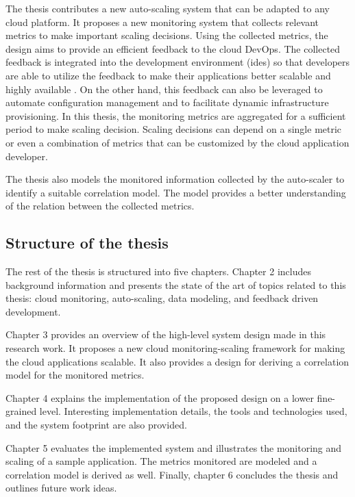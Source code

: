 \documentclass[article,type=msc,colorback,12pt,accentcolor=tud8b,table]{tudthesis}
\begin{document}
	The thesis contributes a new auto-scaling system that can be adapted to any cloud platform. It proposes a new monitoring system that collects relevant metrics to make important scaling decisions. Using the collected metrics, the design aims to provide an efficient feedback to the cloud DevOps. The collected feedback is integrated into the development environment (\gls{ide}s) so that developers are able to utilize the feedback to make their applications better scalable and highly available \cite{cito2015runtime}. On the other hand, this feedback can also be leveraged to automate configuration management and to facilitate dynamic infrastructure provisioning. In this thesis, the monitoring metrics are aggregated for a sufficient period to make scaling decision. Scaling decisions can depend on a single metric or even a combination of metrics that can be customized by the cloud application developer. 
	
	The thesis also models the monitored information collected by the auto-scaler to identify a suitable correlation model. The model provides a better understanding of the relation between the collected metrics. 
	
	\subsection{Structure of the thesis}

	\par The rest of the thesis is structured into five chapters.  Chapter 2 includes background information and presents the state of the art of topics related to this thesis: cloud monitoring, auto-scaling, data modeling, and feedback driven development. 
	
	Chapter 3 provides an overview of the high-level system design made in this research work. It proposes a new cloud monitoring-scaling framework for making the cloud applications scalable. It also provides a design for deriving a correlation model for the monitored metrics.
	
	Chapter 4 explains the implementation of the proposed design on a lower fine-grained level. Interesting implementation details, the tools and technologies used,  and the system footprint are also provided.  
	
	Chapter 5 evaluates the implemented system and illustrates the monitoring and scaling of a sample application. The metrics monitored are modeled and a correlation model is derived as well. Finally, chapter 6 concludes the thesis and outlines future work ideas.
\end{document}
